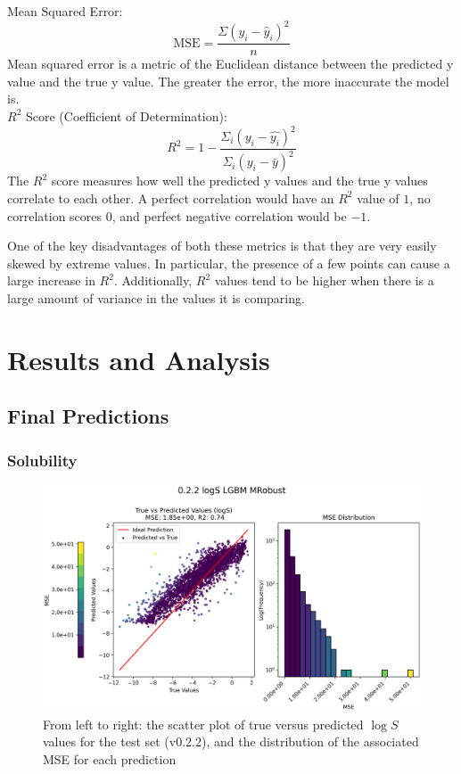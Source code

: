 \documentclass[11pt, titlepage]{article}
\begin{document}
Mean Squared Error:\\ 
\begin{equation}
    \text{MSE} = \frac{\Sigma(y_{i}-\hat{y}_{i})^{2}}{n}
    \label{eq:mse}
\end{equation}
Mean squared error is a metric of the Euclidean distance between the predicted y value and the true y value. The greater the error, the more inaccurate the model is.\\
\newline
$R^{2}$ Score (Coefficient of Determination):\\
\begin{equation}
    R^{2} = 1 - \frac{\Sigma_{i}(y_{i} - \hat{y_{i}})^{2}}{\Sigma_{i}(y_{i}-\bar{y})^{2}}
    \label{eq:r2}
\end{equation}
The $R^{2}$ score measures how well the predicted y values and the true y values correlate to each other.\cite{r2} A perfect correlation would have an $R^{2}$ value of $1$, no correlation scores $0$, and perfect negative correlation would be $-1$. 

One of the key disadvantages of both these metrics is that they are very easily skewed by extreme values. In particular, the presence of a few points can cause a large increase in $R^{2}$. Additionally, $R^{2}$ values tend to be higher when there is a large amount of variance in the values it is comparing\cite{KuhnJohnson}.

\section{Results and Analysis}
\label{sec:results}
\subsection{Final Predictions}
\label{subsec:FinalPreds}
\subsubsection{Solubility}
\begin{figure}[H]
	\centering
	\small
	\includegraphics[width=0.8\linewidth]{figures/0.2.2-PredLogS.png}
	\caption{From left to right: the scatter plot of true versus predicted {$\log S$} values for the test set (v0.2.2), and the distribution of the associated MSE for each prediction}
	\label{fig:PredLogS}
\end{figure}
\end{document}
